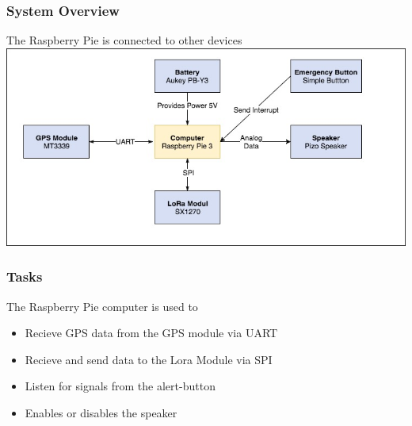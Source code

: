 \documentclass[a4paper,11pt, oneside]{report}
\theoremstyle{definition}
\begin{document}
\subsubsection{System Overview}
The Raspberry Pie is connected to other devices\\[0.3cm]
\includegraphics[width=\textwidth]{img/ATAS_SystemOverview_Tracker_Computer.jpg}

\subsubsection{Tasks}
The Raspberry Pie computer is used to
\begin{itemize}
\item Recieve GPS data from the GPS module via UART
\item Recieve and send data to the Lora Module via SPI
\item Listen for signals from the alert-button
\item Enables or disables the speaker
\end{itemize}
\end{document}
